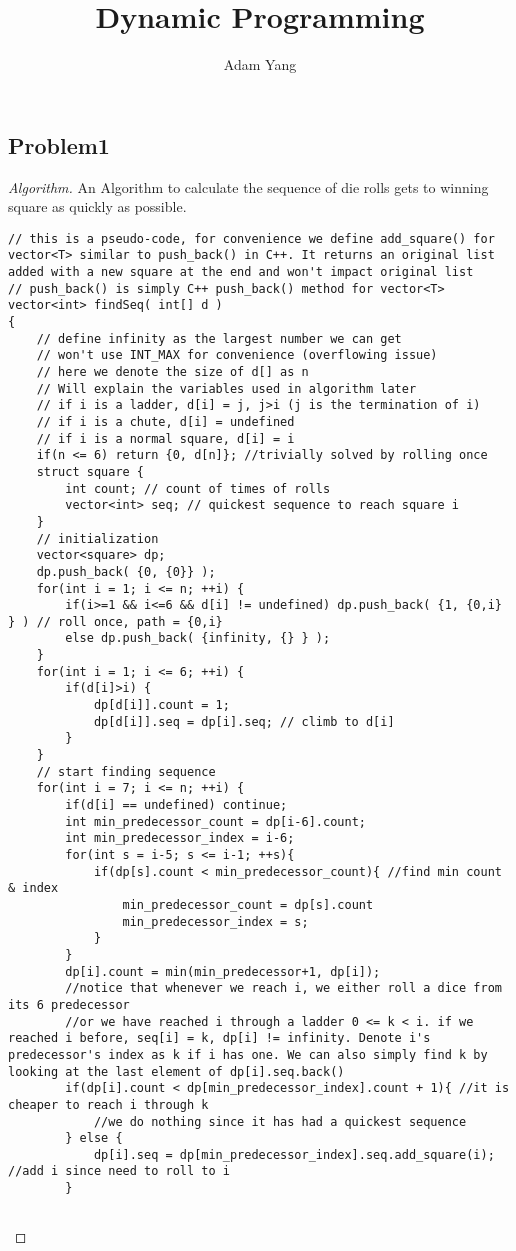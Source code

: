 \documentclass[openany]{article}
\begin{document}
\title{Dynamic Programming}
\author{Adam Yang}
\maketitle




\subsection*{Problem1}


\begin{proof}[Algorithm]{}
		\renewcommand{\qedsymbol}{}
		An Algorithm to calculate the sequence of die rolls gets to winning square as quickly as possible.
		\begin{lstlisting}[basicstyle=\fontsize{8}{9}\selectfont\ttfamily]
// this is a pseudo-code, for convenience we define add_square() for vector<T> similar to push_back() in C++. It returns an original list added with a new square at the end and won't impact original list
// push_back() is simply C++ push_back() method for vector<T>
vector<int> findSeq( int[] d )
{
    // define infinity as the largest number we can get
    // won't use INT_MAX for convenience (overflowing issue)
    // here we denote the size of d[] as n
    // Will explain the variables used in algorithm later
    // if i is a ladder, d[i] = j, j>i (j is the termination of i)
    // if i is a chute, d[i] = undefined
    // if i is a normal square, d[i] = i
    if(n <= 6) return {0, d[n]}; //trivially solved by rolling once
    struct square {
        int count; // count of times of rolls
        vector<int> seq; // quickest sequence to reach square i
    }
    // initialization
    vector<square> dp;
    dp.push_back( {0, {0}} );
    for(int i = 1; i <= n; ++i) {
        if(i>=1 && i<=6 && d[i] != undefined) dp.push_back( {1, {0,i} } ) // roll once, path = {0,i}
        else dp.push_back( {infinity, {} } );
    }
    for(int i = 1; i <= 6; ++i) {
        if(d[i]>i) {
            dp[d[i]].count = 1;
            dp[d[i]].seq = dp[i].seq; // climb to d[i]
        }
    }
    // start finding sequence
    for(int i = 7; i <= n; ++i) {
        if(d[i] == undefined) continue;
        int min_predecessor_count = dp[i-6].count;
        int min_predecessor_index = i-6;
        for(int s = i-5; s <= i-1; ++s){
            if(dp[s].count < min_predecessor_count){ //find min count & index
                min_predecessor_count = dp[s].count
                min_predecessor_index = s;
            }
        }
        dp[i].count = min(min_predecessor+1, dp[i]);
        //notice that whenever we reach i, we either roll a dice from its 6 predecessor
        //or we have reached i through a ladder 0 <= k < i. if we reached i before, seq[i] = k, dp[i] != infinity. Denote i's predecessor's index as k if i has one. We can also simply find k by looking at the last element of dp[i].seq.back()
        if(dp[i].count < dp[min_predecessor_index].count + 1){ //it is cheaper to reach i through k
            //we do nothing since it has had a quickest sequence
        } else {
            dp[i].seq = dp[min_predecessor_index].seq.add_square(i); //add i since need to roll to i
        }
        

\end{lstlisting}
\end{proof}
\end{document}
